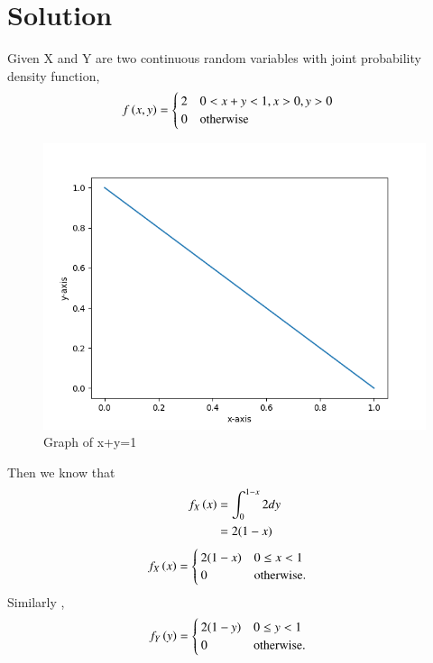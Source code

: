 \documentclass[journal,12pt,twocolumn]{IEEEtran}
\begin{document}
\section{Solution}
Given X and Y are two continuous random variables with joint probability density function,\\
\begin{align}
f\left(x,y\right) &= 
  \begin{cases}
    2 & 0<x+y<1,x>0,y>0\\
    0 & \text{otherwise}\\
  \end{cases}
\end{align}
\begin{figure}[ht]
    \centering
    \includegraphics[width=\columnwidth]{Figure_1.png}
    \caption{Graph of x+y=1}
    \label{Figure_1}
\end{figure}
Then we know that 
\begin{align}
    f_X\left(x\right) & = \int_{0}^{1-x} 2dy\\
    & = 2(1-x)
\end{align}
\begin{align}
f_X\left(x\right) &=
    \begin{cases}
    2(1-x) & 0 \leq x <1\\
    0 & \text{otherwise}.
    \end{cases}
\end{align}
Similarly ,
\begin{align}
f_Y\left(y\right) &=
    \begin{cases}
    2(1-y) & 0 \leq y <1\\
    0 & \text{otherwise}.
    \end{cases}
\end{align}
\end{document}
